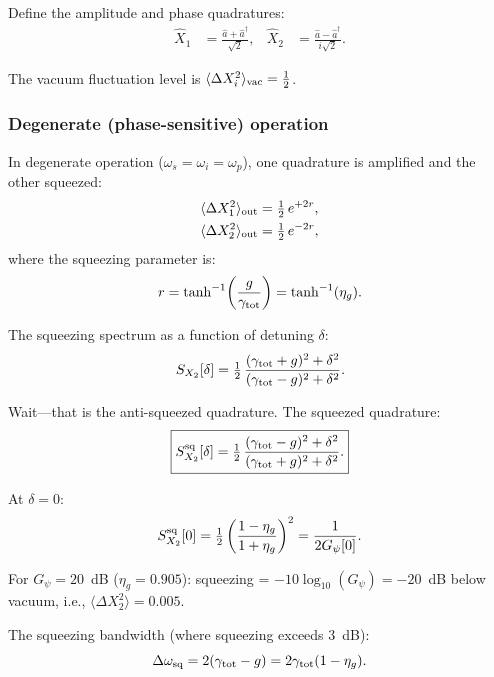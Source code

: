 \documentclass[12pt,aps,prd,twocolumn,superscriptaddress,nofootinbib]{revtex4-2}
\newcommand{\half}{\tfrac{1}{2}}
\begin{document}
Define the amplitude and phase quadratures:
\begin{align}
\hat{X}_1 &= \frac{\hat{a}+\hat{a}^\dagger}{\sqrt{2}}, &
\hat{X}_2 &= \frac{\hat{a}-\hat{a}^\dagger}{i\sqrt{2}}.
\label{eq:quadratures}
\end{align}

The vacuum fluctuation level is
$\langle\Delta X_i^2\rangle_{\rm vac} = \half$.

\subsubsection{Degenerate (phase-sensitive) operation}

In degenerate operation ($\omega_s = \omega_i = \omega_p$), one
quadrature is amplified and the other squeezed:
\begin{align}
\langle\Delta X_1^2\rangle_{\rm out} &= \half\,e^{+2r},
\label{eq:X1_sq}\\
\langle\Delta X_2^2\rangle_{\rm out} &= \half\,e^{-2r},
\label{eq:X2_sq}
\end{align}
where the squeezing parameter is:
\begin{equation}
r = \tanh^{-1}\!\left(\frac{g}{\gamma_{\rm tot}}\right)
= \tanh^{-1}(\eta_g).
\label{eq:squeeze_param}
\end{equation}

The squeezing spectrum as a function of detuning $\delta$:
\begin{equation}
S_{X_2}[\delta] = \half\,\frac{(\gamma_{\rm tot}+g)^2+\delta^2}
{(\gamma_{\rm tot}-g)^2+\delta^2}.
\label{eq:squeeze_spectrum_anti}
\end{equation}

Wait---that is the anti-squeezed quadrature.  The squeezed quadrature:
\begin{equation}
\boxed{
S_{X_2}^{\rm sq}[\delta] = \half\,
\frac{(\gamma_{\rm tot}-g)^2+\delta^2}
{(\gamma_{\rm tot}+g)^2+\delta^2}.
}
\label{eq:squeeze_spectrum}
\end{equation}

At $\delta = 0$:
\begin{equation}
S_{X_2}^{\rm sq}[0] = \half\left(\frac{1-\eta_g}{1+\eta_g}\right)^2
= \frac{1}{2G_\psi[0]}.
\label{eq:squeeze_at_zero}
\end{equation}

For $G_\psi = 20$~dB ($\eta_g = 0.905$): squeezing =
$-10\log_{10}(G_\psi) = -20$~dB below vacuum,
i.e., $\langle\Delta X_2^2\rangle = 0.005$.

The squeezing bandwidth (where squeezing exceeds 3~dB):
\begin{equation}
\Delta\omega_{\rm sq} = 2(\gamma_{\rm tot}-g)
= 2\gamma_{\rm tot}(1-\eta_g).
\label{eq:squeeze_bw}
\end{equation}
\end{document}
